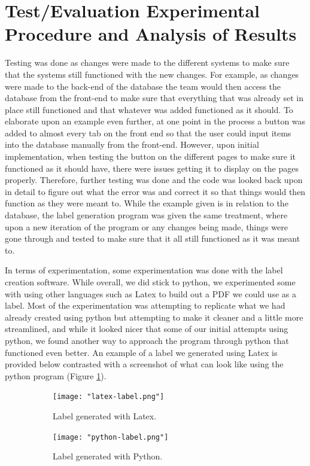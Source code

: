 \documentclass{article}
\begin{document}
\section{Test/Evaluation Experimental Procedure and Analysis of Results} 
Testing was done as changes were made to the different systems to make sure that the systems still functioned with the new changes. 
For example, as changes were made to the back-end of the database the team would then access the database from the front-end to make 
sure that everything that was already set in place still functioned and that whatever was added functioned as it should. To elaborate 
upon an example even further, at one point in the process a button was added to almost every tab on the front end so that the user 
could input items into the database manually from the front-end. However, upon initial implementation, when testing the button on the 
different pages to make sure it functioned as it should have, there were issues getting it to display on the pages properly. 
Therefore, further testing was done and the code was looked back upon in detail to figure out what the error was and correct it so 
that things would then function as they were meant to. While the example given is in relation to the database, the label generation 
program was given the same treatment, where upon a new iteration of the program or any changes being made, things were gone through 
and tested to make sure that it all still functioned as it was meant to. 

In terms of experimentation, some experimentation was done with the label creation software. While overall, we did stick to python, 
we experimented some with using other languages such as Latex to build out a PDF we could use as a label. Most of the 
experimentation was attempting to replicate what we had already created using python but attempting to make it cleaner and a 
little more streamlined, and while it looked nicer that some of our initial attempts using python, we found another way to approach 
the program through python that functioned even better. An example of a label we generated using Latex is provided below contrasted 
with a screenshot of what can look like using the python program (Figure \ref{fig:labels-maggie}). 

\begin{figure}[h!]
    \centering
    \begin{subfigure}[b]{\textwidth}
        \centering
        \texttt{[image: "latex-label.png"]}
        \caption{Label generated with Latex.}
    \end{subfigure}
    \begin{subfigure}[b]{\textwidth}
        \centering
        \texttt{[image: "python-label.png"]}
        \caption{Label generated with Python.}
    \end{subfigure}
    \caption{}
    \label{fig:labels-maggie}
\end{figure}
\FloatBarrier
\end{document}
